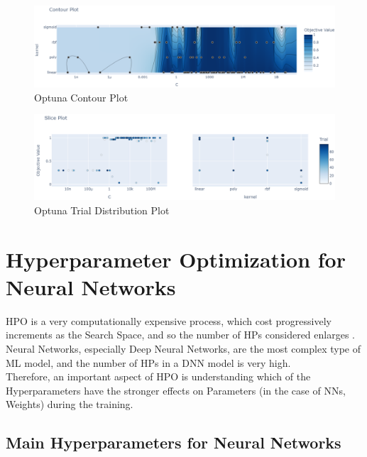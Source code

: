 \begin{figure}[t]
	\centering
	\includegraphics[width=15cm]{figures/figure-2.5.3.png}
	\caption[Optuna Contour Plot]{Optuna Contour Plot}
	\label{fig:figure-2.5.3}
\end{figure}
\begin{figure}[t]
	\centering
	\includegraphics[width=15cm]{figures/figure-2.5.4.png}
	\caption[Optuna Trial Distribution Plot]{Optuna Trial Distribution Plot}
	\label{fig:figure-2.5.4}
\end{figure}

\section{Hyperparameter Optimization for Neural Networks}

HPO is a very computationally expensive process, which cost progressively increments as the Search Space, and so the number of HPs considered enlarges \cite{Tesi-1.9}.
Neural Networks, especially Deep Neural Networks, are the most complex type of ML model, and the number of HPs in a DNN model is very high.
\\[0.3cm]Therefore, an important aspect of HPO is understanding which of the Hyperparameters have the stronger effects on Parameters (in the case of NNs, Weights) during the training.

\subsection{Main Hyperparameters for Neural Networks}

